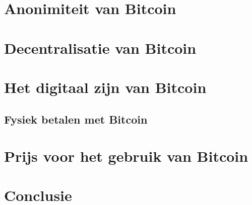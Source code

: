 \documentclass[a4paper]{article}
\begin{document}
\section{Anonimiteit van Bitcoin}

\section{Decentralisatie van Bitcoin}

\section{Het digitaal zijn van Bitcoin}

\subsection{Fysiek betalen met Bitcoin}

\section{Prijs voor het gebruik van Bitcoin}

\section{Conclusie}


\newpage


\end{document}

